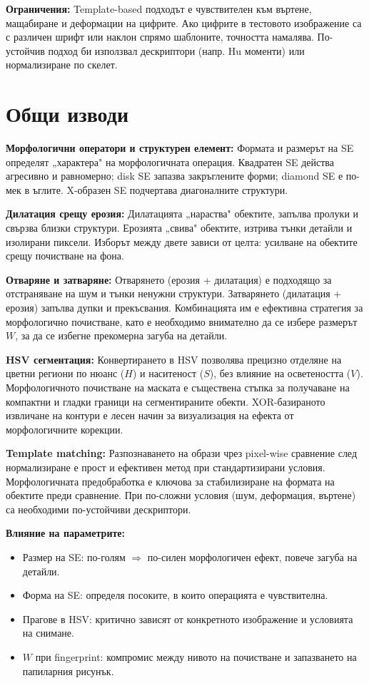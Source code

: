 \textbf{Ограничения:} Template-based подходът е чувствителен към въртене, мащабиране и деформации на цифрите. Ако цифрите в тестовото изображение са с различен шрифт или наклон спрямо шаблоните, точността намалява. По-устойчив подход би използвал дескриптори (напр. Hu моменти) или нормализиране по скелет.

\section{Общи изводи}

\textbf{Морфологични оператори и структурен елемент:} Формата и размерът на SE определят „характера" на морфологичната операция. Квадратен SE действа агресивно и равномерно; disk SE запазва закръглените форми; diamond SE е по-мек в ъглите. X-образен SE подчертава диагоналните структури.

\textbf{Дилатация срещу ерозия:} Дилатацията „нараства" обектите, запълва пролуки и свързва близки структури. Ерозията „свива" обектите, изтрива тънки детайли и изолирани пиксели. Изборът между двете зависи от целта: усилване на обектите срещу почистване на фона.

\textbf{Отваряне и затваряне:} Отварянето (ерозия + дилатация) е подходящо за отстраняване на шум и тънки ненужни структури. Затварянето (дилатация + ерозия) запълва дупки и прекъсвания. Комбинацията им е ефективна стратегия за морфологично почистване, като е необходимо внимателно да се избере размерът $W$, за да се избегне прекомерна загуба на детайли.

\textbf{HSV сегментация:} Конвертирането в HSV позволява прецизно отделяне на цветни региони по нюанс ($H$) и наситеност ($S$), без влияние на осветеността ($V$). Морфологичното почистване на маската е съществена стъпка за получаване на компактни и гладки граници на сегментираните обекти. XOR-базираното извличане на контури е лесен начин за визуализация на ефекта от морфологичните корекции.

\textbf{Template matching:} Разпознаването на образи чрез pixel-wise сравнение след нормализиране е прост и ефективен метод при стандартизирани условия. Морфологичната предобработка е ключова за стабилизиране на формата на обектите преди сравнение. При по-сложни условия (шум, деформация, въртене) са необходими по-устойчиви дескриптори.

\textbf{Влияние на параметрите:}
\begin{itemize}
    \item Размер на SE: по-голям $\Rightarrow$ по-силен морфологичен ефект, повече загуба на детайли.
    \item Форма на SE: определя посоките, в които операцията е чувствителна.
    \item Прагове в HSV: критично зависят от конкретното изображение и условията на снимане.
    \item $W$ при fingerprint: компромис между нивото на почистване и запазването на папиларния рисунък.
\end{itemize}

